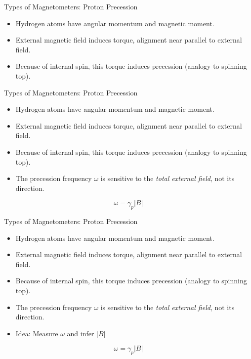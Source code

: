 \begin{frame}
  \begin{PointSix}{Types of Magnetometers: Proton Precession}
    \small
    \begin{itemize}
      \item Hydrogen atoms have angular momentum and magnetic moment.
      \item External magnetic field induces torque, alignment near parallel to external field.
      \item Because of internal spin, this torque induces precession (analogy to spinning top).
    \end{itemize}
  \end{PointSix}
\end{frame}

\begin{frame}
  \begin{PointSix}{Types of Magnetometers: Proton Precession}
    \small
    \begin{itemize}
      \item Hydrogen atoms have angular momentum and magnetic moment.
      \item External magnetic field induces torque, alignment near parallel to external field.
      \item Because of internal spin, this torque induces precession (analogy to spinning top).
      \item The precession frequency $\omega$ is sensitive to the \textit{total external field}, not its direction. 
    \end{itemize}
    $$
      \omega = \gamma_p |B|
    $$
  \end{PointSix}
\end{frame}

\begin{frame}
  \begin{PointSix}{Types of Magnetometers: Proton Precession}
    \small
    \begin{itemize}
      \item Hydrogen atoms have angular momentum and magnetic moment.
      \item External magnetic field induces torque, alignment near parallel to external field.
      \item Because of internal spin, this torque induces precession (analogy to spinning top).
      \item The precession frequency $\omega$ is sensitive to the \textit{total external field}, not its direction. 
      \item \alert{Idea: Measure $\omega$ and infer $|B|$}
    \end{itemize}
    $$
      \omega = \gamma_p |B|
    $$
  \end{PointSix}
\end{frame}

